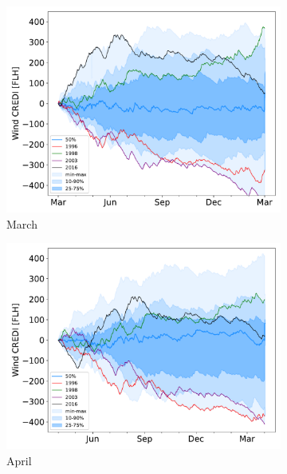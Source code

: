 \documentclass[12pt]{iopart}
\begin{document}
\begin{figure}[b]
\begin{subfigure}[t]{0.32\linewidth}
    \includegraphics[width=\linewidth]{Figures_SI/Fig_CUMSUM_YearStart_March}
    \caption{March }
\end{subfigure}
\begin{subfigure}[t]{0.32\linewidth}
    \includegraphics[width=\linewidth]{Figures_SI/Fig_CUMSUM_YearStart_April}
    \caption{April }
\end{subfigure}
\begin{subfigure}[t]{0.32\linewidth}

\end{subfigure}
\end{figure}
\end{document}
